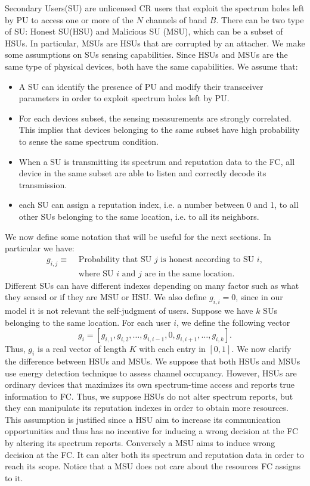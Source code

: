 \documentclass[letterpaper, 10 pt, conference]{ieeeconf}  %
\begin{document}
Secondary Users(SU) are unlicensed CR users that exploit the spectrum holes left by PU to access one or more of the $N$ channels of band $B$. There can be two type of SU: Honest SU(HSU) and Malicious SU (MSU), which can be a subset of HSUs\cite{rawat}\cite{ma}\cite{hyder}. In particular, MSUs are HSUs that are corrupted by an attacher. We make some assumptions on SUs sensing capabilities. Since HSUs and MSUs are the same type of physical devices, both have the same capabilities. We assume that:
\begin{itemize}
\item {A SU can identify the presence of PU and modify their transceiver parameters in order to exploit spectrum holes left by PU.}
\item{For each devices subset, the sensing measurements are strongly correlated. This implies that devices belonging to the same subset have high probability to sense the same spectrum condition\cite{qingao}.}
\item{When a SU is transmitting its spectrum and reputation data to the FC, all device in the same subset are able to listen and correctly decode its transmission.}
\item{each SU can assign a reputation index, i.e. a number between 0 and 1, to all other SUs belonging to the same location, i.e. to all its neighbors.}
\end{itemize}
We now define some notation that will be useful for the next sections. In particular we have:
\begin{equation}
\begin{aligned}
g_{i,j}\equiv & \text{ Probability that SU }j\text{ is honest according to SU }i,\\
&\text{ where SU }i\text{ and }j\text{ are in the same location.}
\end{aligned}
\end{equation}
Different SUs can have different indexes depending on many factor such as what they sensed or if they are MSU or HSU. We also define $g_{i,i}=0$, since in our model it is not relevant the self-judgment of users. Suppose we have $k$ SUs belonging to the same location. For each user $i$, we define the following vector
\begin{equation}
g_i=[g_{i,1},g_{i,2},\dots,g_{i,i-1},0,g_{i,i+1},\dots,g_{i,k}]. 
\label{indexes}
\end{equation}
Thus, $g_i$ is a real vector of length $K$ with each entry in $[0,1]$. 
We now clarify the difference between HSUs and MSUs. We suppose that both HSUs and MSUs use energy detection technique to assess channel occupancy. However, HSUs are ordinary devices that maximizes its own spectrum-time access and reports true information to FC. Thus, we suppose HSUs do not alter spectrum reports, but they can manipulate its reputation indexes in order to obtain more resources. This assumption is justified since a HSU aim to increase its communication opportunities and thus has no incentive for inducing a wrong decision at the FC by altering its spectrum reports. Conversely a MSU aims to induce wrong decision at the FC. It can alter both its spectrum and reputation data in order to reach its scope. Notice that a MSU does not care about the resources FC assigns to it.
\end{document}
